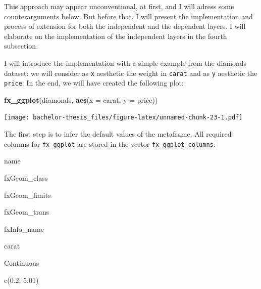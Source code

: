 \documentclass[]{report}
\newenvironment{Shaded}{\begin{snugshade}}{\end{snugshade}}
\newcommand{\KeywordTok}[1]{\textcolor[rgb]{0.13,0.29,0.53}{\textbf{#1}}}
\newcommand{\DataTypeTok}[1]{\textcolor[rgb]{0.13,0.29,0.53}{#1}}
\newcommand{\StringTok}[1]{\textcolor[rgb]{0.31,0.60,0.02}{#1}}
\newcommand{\OperatorTok}[1]{\textcolor[rgb]{0.81,0.36,0.00}{\textbf{#1}}}
\newcommand{\NormalTok}[1]{#1}
\theoremstyle{definition}
\theoremstyle{definition}
\theoremstyle{definition}
\theoremstyle{remark}
\begin{document}
This approach may appear unconventional, at first, and I will adress
some counterarguments below. But before that, I will present the
implementation and process of extension for both the independent and the
dependent layers. I will elaborate on the implementation of the
independent layers in the fourth subsection.

I will introduce the implementation with a simple example from the
diamonds dataset: we will consider as \texttt{x} aesthetic the weight in
\texttt{carat} and as \texttt{y} aesthetic the \texttt{price}. In the
end, we will have created the following plot:

\begin{Shaded}
\begin{Highlighting}[]
\KeywordTok{fx_ggplot}\NormalTok{(diamonds, }\KeywordTok{aes}\NormalTok{(}\DataTypeTok{x =}\NormalTok{ carat, }\DataTypeTok{y =}\NormalTok{ price))}
\end{Highlighting}
\end{Shaded}

\texttt{[image: bachelor-thesis\_files/figure-latex/unnamed-chunk-23-1.pdf]}

The first step is to infer the default values of the metaframe. All
required columns for \texttt{fx\_ggplot} are stored in the vector
\texttt{fx\_ggplot\_columns}:

\begin{Shaded}
\end{Shaded}

name

fxGeom\_class

fxGeom\_limits

fxGeom\_trans

fxInfo\_name

carat

Continuous

c(0.2, 5.01)
\end{document}
